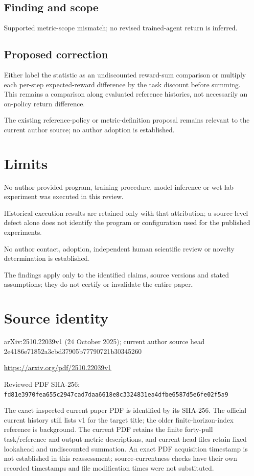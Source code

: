 \documentclass[11pt]{article}
\begin{document}
\subsection*{Finding and scope}

Supported metric-scope mismatch; no revised trained-agent return is inferred.

\subsection*{Proposed correction}

Either label the statistic as an undiscounted reward-sum comparison or multiply each per-step expected-reward difference by the task discount before summing. This remains a comparison along evaluated reference histories, not necessarily an on-policy return difference.

The existing reference-policy or metric-definition proposal remains relevant to the current author source; no author adoption is established.

\section*{Limits}

No author-provided program, training procedure, model inference or wet-lab experiment was executed in this review.\par

Historical execution results are retained only with that attribution; a source-level defect alone does not identify the program or configuration used for the published experiments.\par

No author contact, adoption, independent human scientific review or novelty determination is established.\par

The findings apply only to the identified claims, source versions and stated assumptions; they do not certify or invalidate the entire paper.\par

\section*{Source identity}

arXiv:2510.22039v1 (24 October 2025); current author source head 2e4186e71852a3cbd37905b77790721b30345260

\url{https://arxiv.org/pdf/2510.22039v1}

Reviewed PDF SHA-256: \nolinkurl{fd81e3970fea655c2947cad7daa6618e8c3324831ea4dfbe6587d5e6fe02f5a9}

The exact inspected current paper PDF is identified by its SHA-256. The official current history still lists v1 for the target title; the older finite-horizon-index reference is background. The current PDF retains the finite forty-pull task/reference and output-metric descriptions, and current-head files retain fixed lookahead and undiscounted summation. An exact PDF acquisition timestamp is not established in this reassessment; source-currentness checks have their own recorded timestamps and file modification times were not substituted.
\end{document}
